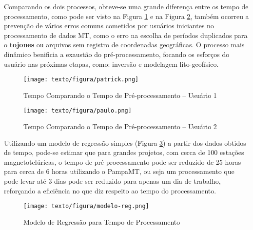     Comparando os dois processos, obteve-se uma grande diferença entre os tempo de processamento, como pode ser visto na Figura \ref{tempo-pa} e na Figura \ref{tempo-pau}, também ocorreu a prevenção de vários erros comuns cometidos por usuários iniciantes no processamento de dados MT, como o erro na escolha de períodos duplicados para o \textbf{tojones} ou arquivos sem registro de coordenadas geográficas. O processo mais dinâmico benificia a exaustão do pré-processamento, focando os esforços do usuário nas próximas etapas, como: inversão e modelagem lito-geofísico. 
        
    
    \begin{figure}[H]
        \caption{Tempo Comparando o Tempo de Pré-processamento -- Usuário 1}
            \begin{center}
                \texttt{[image: texto/figura/patrick.png]}
            \end{center}
        \legend{\Fonte{\oautor}}
        \label{tempo-pa}
    \end{figure}
    
    \begin{figure}[H]
        \caption{Tempo Comparando o Tempo de Pré-processamento -- Usuário 2}
            \begin{center}
                \texttt{[image: texto/figura/paulo.png]}
            \end{center}
        \legend{\Fonte{\oautor}}
        \label{tempo-pau}
    \end{figure}
    
    
    Utilizando um modelo de regressão simples (Figura \ref{modelo-reg}) a partir dos dados obtidos de tempo, pode-se estimar que para grandes projetos, com cerca de 100 estações magnetotelúricas, o tempo de pré-processamento pode ser reduzido de 25 horas para cerca de 6 horas utilizando o PampaMT, ou seja um processamento que pode levar até 3 dias pode ser reduzido para apenas um dia de trabalho, reforçando a eficiência no que diz respeito ao tempo do processamento.   
    
    \begin{figure}[H]
        \caption{Modelo de Regressão para Tempo de Processamento}
            \begin{center}
                \texttt{[image: texto/figura/modelo-reg.png]}
            \end{center}
        \legend{\Fonte{\oautor}}
        \label{modelo-reg}
    \end{figure}      
        
